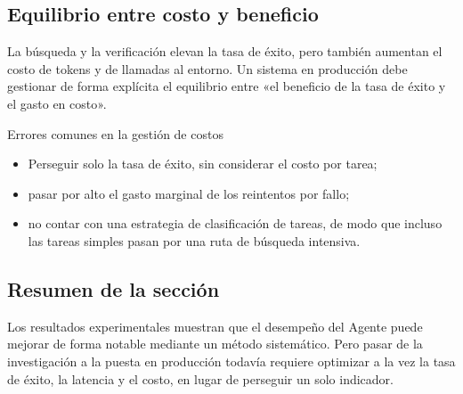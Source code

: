 \subsection{Equilibrio entre costo y beneficio}
La búsqueda y la verificación elevan la tasa de éxito, pero también aumentan el costo de tokens y de llamadas al entorno. Un sistema en producción debe gestionar de forma explícita el equilibrio entre «el beneficio de la tasa de éxito y el gasto en costo».

\begin{warningbox}{Errores comunes en la gestión de costos}
\begin{itemize}
    \item Perseguir solo la tasa de éxito, sin considerar el costo por tarea;
    \item pasar por alto el gasto marginal de los reintentos por fallo;
    \item no contar con una estrategia de clasificación de tareas, de modo que incluso las tareas simples pasan por una ruta de búsqueda intensiva.
\end{itemize}
\end{warningbox}

\subsection{Resumen de la sección}
Los resultados experimentales muestran que el desempeño del Agente puede mejorar de forma notable mediante un método sistemático. Pero pasar de la investigación a la puesta en producción todavía requiere optimizar a la vez la tasa de éxito, la latencia y el costo, en lugar de perseguir un solo indicador.

